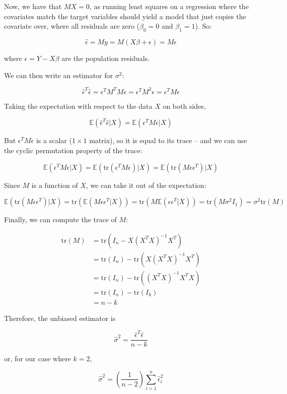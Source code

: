 Now, we have that \(MX = 0\), as running least squares on a regression
where the covariates match the target variables should yield a model
that just copies the covariate over, where all residuals are zero
(\(\beta_0 = 0\) and \(\beta_1 = 1\)). So:

\[\hat{\epsilon} = M y = M( X \beta + \epsilon) = M\epsilon\]

where \(\epsilon = Y - X\beta\) are the population residuals.

We can then write an estimator for \(\sigma^2\):

\[ \hat{\epsilon}^T \hat{\epsilon} = \epsilon^T M^T M \epsilon = \epsilon^T M^2 \epsilon = \epsilon^T M \epsilon\]

Taking the expectation with respect to the data \(X\) on both sides,

\[\mathbb{E}(\hat{\epsilon}^T \hat{\epsilon} | X) = \mathbb{E}(\epsilon^T M \epsilon | X)\]

But \(\epsilon^T M \epsilon\) is a scalar (\(1 \times 1\) matrix), so it
is equal to its trace -- and we can use the cyclic permutation property
of the trace:

\[ \mathbb{E}(\epsilon^T M \epsilon | X) = \mathbb{E}(\text{tr}(\epsilon^T M \epsilon) | X) = \mathbb{E}(\text{tr}(M \epsilon \epsilon^T) | X)\]

Since \(M\) is a function of \(X\), we can take it out of the
expectation:

\[\mathbb{E}(\text{tr}(M \epsilon \epsilon^T) | X) = \text{tr}(\mathbb{E}(M \epsilon \epsilon^T | X))
= \text{tr}(M \mathbb{E}(\epsilon \epsilon^T | X))
= \text{tr}(M \sigma^2 I_1)
= \sigma^2 \text{tr}(M)
\]

Finally, we can compute the trace of \(M\):

\begin{align}
\text{tr}(M) &= \text{tr}(I_n - X(X^T X)^{-1}X^T)\\
&= \text{tr}(I_n) - \text{tr}(X(X^T X)^{-1}X^T) \\
&= \text{tr}(I_n) - \text{tr}((X^T X)^{-1}X^T X) \\
&= \text{tr}(I_n) - \text{tr}(I_k)  \\
&= n - k
\end{align}

Therefore, the unbiased estimator is

\[\hat{\sigma}^2 = \frac{\hat{\epsilon}^T \hat{\epsilon}}{n - k}\]

or, for our case where \(k = 2\),

\[\hat{\sigma}^2 = \left( \frac{1}{n - 2} \right) \sum_{i=1}^n \hat{\epsilon}_i^2\]

